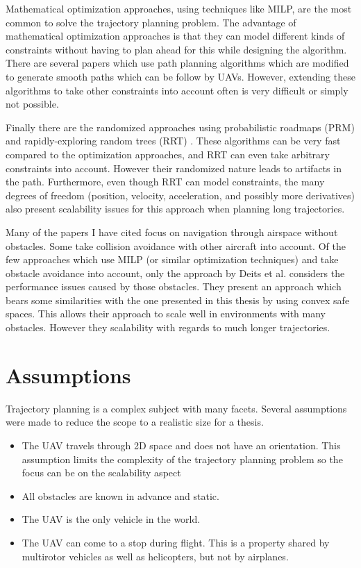 \par
Mathematical optimization approaches, using techniques like MILP, are the most common to solve the trajectory planning problem. The advantage of mathematical optimization approaches is that they can model different kinds of constraints without having to plan ahead for this while designing the algorithm. There are several papers \cite{Jung2008}\cite{Askari2016}\cite{Gao2013}\cite{DeFilippis2012} which use path planning algorithms which are modified to generate smooth paths which can be follow by UAVs. However, extending these algorithms to take other constraints into account often is very difficult or simply not possible.
\par
Finally there are the randomized approaches using probabilistic roadmaps (PRM)\cite{Naderi2015} \cite{Kavraki1996}\cite{Saha2006} and rapidly-exploring random trees (RRT) \cite{LaValle1998}\cite{Tsai2015}\cite{Naderi2015}. These algorithms can be very fast compared to the optimization approaches, and RRT can even take arbitrary constraints into account. However their randomized nature leads to artifacts in the path. Furthermore, even though RRT can model constraints, the many degrees of freedom  (position, velocity, acceleration, and possibly more derivatives) also present scalability issues for this approach when planning long trajectories.
\par
Many of the papers I have cited focus on navigation through airspace without obstacles. Some take collision avoidance with other aircraft into account. Of the few approaches which use MILP (or similar optimization techniques) and take obstacle avoidance into account, only the approach by Deits et al. \cite{Deits2015} considers the performance issues caused by those obstacles. They present an approach which bears some similarities with the one presented in this thesis by using convex safe spaces. This allows their approach to scale well in environments with many obstacles. However they scalability with regards to much longer trajectories.

\section{Assumptions}
Trajectory planning is a complex subject with many facets. Several assumptions were made to reduce the scope to a realistic size for a thesis.
\begin{itemize}
\item The UAV travels through 2D space and does not have an orientation. This assumption limits the complexity of the trajectory planning problem so the focus can be on the scalability aspect 
\item All obstacles are known in advance and static.
\item The UAV is the only vehicle in the world.
\item The UAV can come to a stop during flight. This is a property shared by multirotor vehicles as well as helicopters, but not by airplanes.
\end{itemize}